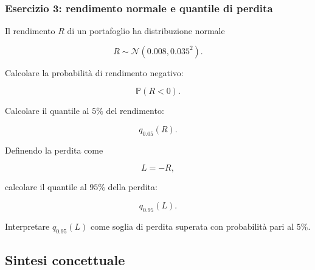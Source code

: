 \documentclass[handout]{beamer}%
\providecommand{\Prob}{\mathbb{P}}
\providecommand{\1}{\mathbf{1}}
\providecommand{\QTR}[2]{\csname #1\endcsname{#2}}
\begin{document}
\begin{frame}%
%

\frametitle{Esercizio 3: rendimento normale e quantile di perdita}%


Il rendimento $R$ di un portafoglio ha distribuzione normale%

\[
R\sim\mathcal{N}(0.008,0.035^{2}).
\]


Calcolare la probabilit\`{a} di rendimento negativo:%

\[
\Prob(R<0).
\]


\medskip

Calcolare il quantile al $5\%$ del rendimento:%

\[
q_{0.05}(R).
\]


\medskip

Definendo la perdita come%

\[
L=-R,
\]


calcolare il quantile al $95\%$ della perdita:%

\[
q_{0.95}(L).
\]


\medskip

Interpretare $q_{0.95}(L)$ come soglia di perdita superata con probabilit\`{a}
pari al $5\%$.%

\transboxout
\end{frame}%




\subsection{Sintesi concettuale}%
\end{document}
